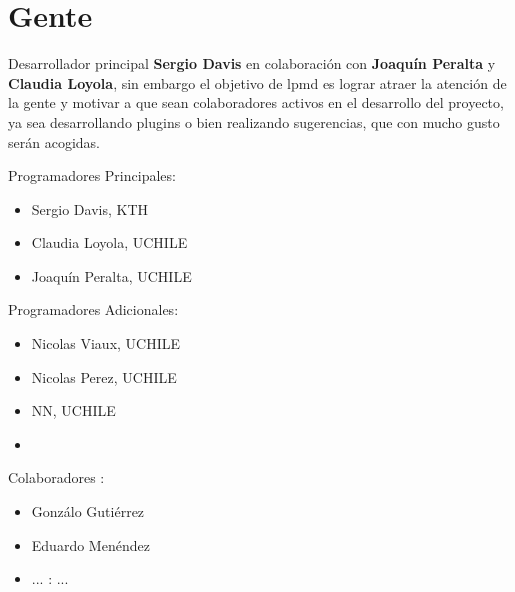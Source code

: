 \chapter{Gente}
\label{chap:auth}

Desarrollador principal \textbf{Sergio Davis} en colaboraci\'on con \textbf{Joaqu\'in Peralta} y \textbf{Claudia Loyola}, sin embargo el objetivo de lpmd es lograr atraer la atenci\'on de la gente y motivar a que sean colaboradores activos en el desarrollo del proyecto, ya sea desarrollando plugins o bien realizando sugerencias, que con mucho gusto ser\'an acogidas.

Programadores Principales:

\begin{itemize}
 \item Sergio Davis, KTH
 \item Claudia Loyola, UCHILE
 \item Joaqu\'in Peralta, UCHILE
\end{itemize}

Programadores Adicionales:

\begin{itemize}
 \item Nicolas Viaux, UCHILE
 \item Nicolas Perez, UCHILE
 \item NN, UCHILE
 \item 
\end{itemize}

Colaboradores :

\begin{itemize}
 \item Gonz\'alo Guti\'errez
 \item Eduardo Men\'endez
\end{itemize}


\begin{itemize}
 \item ... : ...
\end{itemize}
